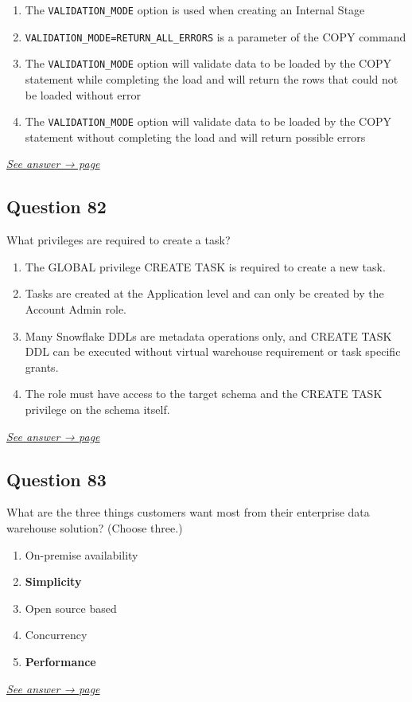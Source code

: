 \documentclass[12pt]{article}
\newcommand{\seeanswer}[1]{%
  \par\smallskip\emph{\hyperref[ans:#1]{See answer → page \pageref{ans:#1}}}%
}
\begin{document}
\begin{enumerate}[label=\Alph*.]
  \item The \texttt{VALIDATION\_MODE} option is used when creating an Internal Stage
  \item \texttt{VALIDATION\_MODE=RETURN\_ALL\_ERRORS} is a parameter of the COPY command
  \item The \texttt{VALIDATION\_MODE} option will validate data to be loaded by the COPY statement while completing the load and will return the rows that could not be loaded without error
  \item The \texttt{VALIDATION\_MODE} option will validate data to be loaded by the COPY statement without completing the load and will return possible errors
\end{enumerate}
\seeanswer{81}

\subsection*{Question 82}\label{q:82}
What privileges are required to create a task?

\begin{enumerate}[label=\Alph*.]
  \item The GLOBAL privilege CREATE TASK is required to create a new task.
  \item Tasks are created at the Application level and can only be created by the Account Admin role.
  \item Many Snowflake DDLs are metadata operations only, and CREATE TASK DDL can be executed without virtual warehouse requirement or task specific grants.
  \item The role must have access to the target schema and the CREATE TASK privilege on the schema itself.
\end{enumerate}
\seeanswer{82}

\subsection*{Question 83}\label{q:83}
What are the three things customers want most from their enterprise data warehouse solution? (Choose three.)

\begin{enumerate}[label=\Alph*.]
  \item On-premise availability
  \item \textbf{Simplicity}
  \item Open source based
  \item Concurrency
  \item \textbf{Performance}
\end{enumerate}
\seeanswer{83}
\end{document}
